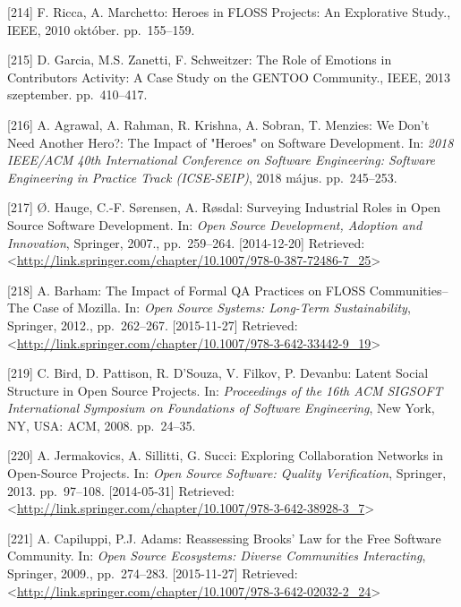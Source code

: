 \documentclass[12pt,magyar,a4paper,oneside]{scrreprt}
\newenvironment{cslreferences}%
  {}%
  {\par}
\begin{document}
\begin{cslreferences}
\leavevmode\hypertarget{ref-ricca_heroes_2010}{}%
{[}214{]} F. Ricca, A. Marchetto: Heroes in FLOSS Projects: An
Explorative Study., IEEE, 2010 október. pp.~155--159.

\leavevmode\hypertarget{ref-garcia_role_2013}{}%
{[}215{]} D. Garcia, M.S. Zanetti, F. Schweitzer: The Role of Emotions
in Contributors Activity: A Case Study on the GENTOO Community., IEEE,
2013 szeptember. pp.~410--417.

\leavevmode\hypertarget{ref-agrawal_we_2018}{}%
{[}216{]} A. Agrawal, A. Rahman, R. Krishna, A. Sobran, T. Menzies: We
Don't Need Another Hero?: The Impact of "Heroes" on Software
Development. In: \emph{2018 IEEE/ACM 40th International Conference on
Software Engineering: Software Engineering in Practice Track
(ICSE-SEIP)}, 2018 május. pp.~245--253.

\leavevmode\hypertarget{ref-hauge_surveying_2007}{}%
{[}217{]} Ø. Hauge, C.-F. Sørensen, A. Røsdal: Surveying Industrial
Roles in Open Source Software Development. In: \emph{Open Source
Development, Adoption and Innovation}, Springer, 2007., pp.~259--264.
{[}2014-12-20{]} Retrieved:
\textless{}\url{http://link.springer.com/chapter/10.1007/978-0-387-72486-7_25}\textgreater{}

\leavevmode\hypertarget{ref-barham_impact_2012}{}%
{[}218{]} A. Barham: The Impact of Formal QA Practices on FLOSS
Communities--The Case of Mozilla. In: \emph{Open Source Systems:
Long-Term Sustainability}, Springer, 2012., pp.~262--267.
{[}2015-11-27{]} Retrieved:
\textless{}\url{http://link.springer.com/chapter/10.1007/978-3-642-33442-9_19}\textgreater{}

\leavevmode\hypertarget{ref-bird_latent_2008}{}%
{[}219{]} C. Bird, D. Pattison, R. D'Souza, V. Filkov, P. Devanbu:
Latent Social Structure in Open Source Projects. In: \emph{Proceedings
of the 16th ACM SIGSOFT International Symposium on Foundations of
Software Engineering}, New York, NY, USA: ACM, 2008. pp.~24--35.

\leavevmode\hypertarget{ref-jermakovics_exploring_2013}{}%
{[}220{]} A. Jermakovics, A. Sillitti, G. Succi: Exploring Collaboration
Networks in Open-Source Projects. In: \emph{Open Source Software:
Quality Verification}, Springer, 2013. pp.~97--108. {[}2014-05-31{]}
Retrieved:
\textless{}\url{http://link.springer.com/chapter/10.1007/978-3-642-38928-3_7}\textgreater{}

\leavevmode\hypertarget{ref-capiluppi_reassessing_2009}{}%
{[}221{]} A. Capiluppi, P.J. Adams: Reassessing Brooks' Law for the Free
Software Community. In: \emph{Open Source Ecosystems: Diverse
Communities Interacting}, Springer, 2009., pp.~274--283.
{[}2015-11-27{]} Retrieved:
\textless{}\url{http://link.springer.com/chapter/10.1007/978-3-642-02032-2_24}\textgreater{}


\end{cslreferences}
\end{document}
